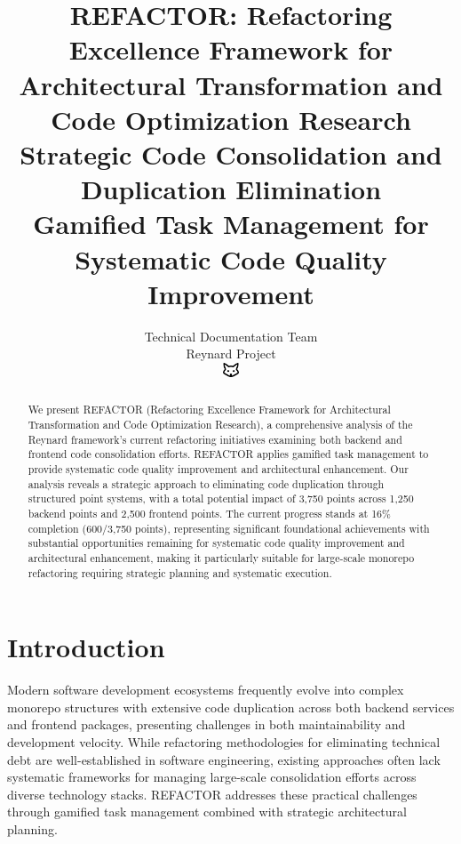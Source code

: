 \documentclass[10pt]{article}
\begin{document}
\title{REFACTOR: Refactoring Excellence Framework for Architectural Transformation and Code Optimization Research \\
\Large{Strategic Code Consolidation and Duplication Elimination} \\
\large{Gamified Task Management for Systematic Code Quality Improvement}}

\author{Technical Documentation Team\\
Reynard Project\\
\includegraphics[width=0.5cm]{../../shared-assets/favicon.pdf}}
\maketitle

\begin{abstract}
We present REFACTOR (Refactoring Excellence Framework for Architectural Transformation and Code Optimization Research), a comprehensive analysis of the Reynard framework's current refactoring initiatives examining both backend and frontend code consolidation efforts. REFACTOR applies gamified task management to provide systematic code quality improvement and architectural enhancement. Our analysis reveals a strategic approach to eliminating code duplication through structured point systems, with a total potential impact of 3,750 points across 1,250 backend points and 2,500 frontend points. The current progress stands at 16\% completion (600/3,750 points), representing significant foundational achievements with substantial opportunities remaining for systematic code quality improvement and architectural enhancement, making it particularly suitable for large-scale monorepo refactoring requiring strategic planning and systematic execution.
\end{abstract}

\section{Introduction}

Modern software development ecosystems frequently evolve into complex monorepo structures with extensive code duplication across both backend services and frontend packages, presenting challenges in both maintainability and development velocity. While refactoring methodologies for eliminating technical debt are well-established in software engineering, existing approaches often lack systematic frameworks for managing large-scale consolidation efforts across diverse technology stacks. REFACTOR addresses these practical challenges through gamified task management combined with strategic architectural planning.
\end{document}
